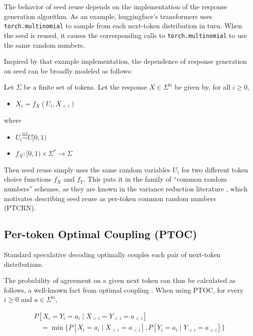 \documentclass{article}
\newcommand{\N}{\mathbb{N}}
\newcommand{\iidsim}{\overset{\text{iid}}{\sim}}
\begin{document}
The behavior of seed reuse depends on the implementation of the response generation algorithm. As an example, huggingface's transformers \cite{wolf2020huggingfacestransformersstateoftheartnatural} uses \texttt{torch.\allowbreak multinomial} to sample from each next-token distribution in turn. When the seed is reused, it causes the corresponding calls to \texttt{torch.multinomial} to use the same random numbers.

Inspired by that example implementation, the dependence of response generation on seed can be broadly modeled as follows:

Let $\Sigma$ be a finite set of tokens. Let the response $X \in \Sigma^\N$ be given by, for all $i \geq 0$,

\begin{itemize}
    \item $X_i = f_X(U_i, X_{<i})$
\end{itemize}

where

\begin{itemize}
    \item $U_i \iidsim U[0,1)$
    \item $f_X : [0,1) \times \Sigma^* \to \Sigma$
\end{itemize}

Then seed reuse simply uses the same random variables $U_i$ for two different token choice functions $f_X$ and $f_Y$. This puts it in the family of ``common random numbers'' schemes, as they are known in the variance reduction literature \cite{rubinstein2016simulation}, which motivates describing seed reuse as per-token common random numbers (PTCRN).

\subsection*{Per-token Optimal Coupling (PTOC)}

Standard speculative decoding \cite{leviathan2023fast} \cite{chen2023acceleratinglargelanguagemodel} optimally couples each pair of next-token distributions.

The probability of agreement on a given next token can thus be calculated as follows, a well-known fact from optimal coupling \cite{angel2021pairwiseoptimalcouplingmultiple}. When using PTOC, for every $i \geq 0$ and $a \in \Sigma^\N$,

\begin{equation}
\begin{split}
&P[X_i = Y_i = a_i \mid X_{<i} = Y_{<i} = a_{<i}] \\
&\quad= \min \{ P[X_i = a_i \mid X_{<i} = a_{<i}], P[Y_i = a_i \mid Y_{<i} = a_{<i}] \}
\end{split}
\end{equation}
\end{document}
